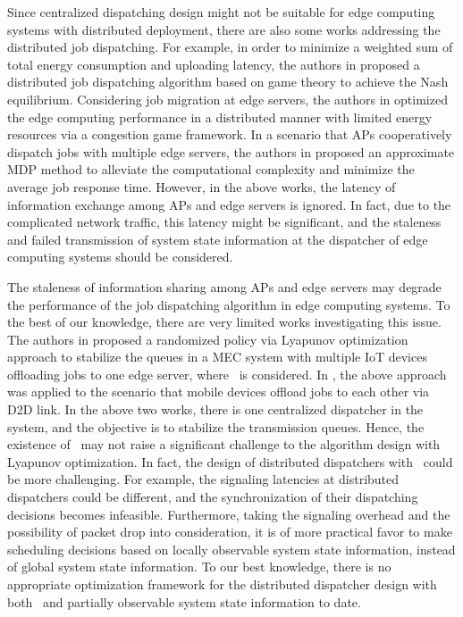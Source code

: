 Since centralized dispatching design might not be suitable for {edge computing systems} with distributed deployment, there are also some works addressing the distributed job dispatching.
For example, in order to minimize a weighted sum of total energy consumption and uploading latency, the authors in \cite{ToN-Xuchen2016} proposed a distributed job dispatching algorithm based on game theory to achieve the Nash equilibrium. 
Considering job migration at edge servers, the authors in \cite{ToN-xujie2018} optimized the edge computing performance in a distributed manner with limited energy resources via a congestion game framework.
In a scenario that APs cooperatively dispatch jobs with multiple edge servers, the authors in \cite{mdp-jcin} proposed {an} approximate MDP method to alleviate the computational complexity and minimize the average job response time.
However, in the above works, the latency of information exchange among APs and edge servers is ignored.
In fact, due to the complicated network traffic, this latency might be significant, and the staleness {and failed transmission} of system state information at the dispatcher of edge computing systems should be considered.

The staleness of information sharing among APs and edge servers may degrade the performance of the job dispatching algorithm in edge computing systems.
To the best of our knowledge, there are very limited works investigating this issue.
The authors in \cite{JSAC17-LyuX} proposed a randomized policy via Lyapunov optimization approach to stabilize the queues in a MEC system with multiple IoT devices offloading jobs to one edge server, where \brlatency~is considered. 
In \cite{TWC18-LyuX}, the above approach was applied to the scenario that mobile devices offload jobs to each other via D2D link.
In the above two works, there is one centralized dispatcher in the system, and the objective is to stabilize the transmission queues.
Hence, the existence of \brlatency~may not raise a significant challenge to the algorithm design with Lyapunov optimization.
In fact, the design of distributed dispatchers with \brlatency~could be more challenging.
For example, the signaling latencies at distributed dispatchers could be different, and the synchronization of their dispatching decisions becomes infeasible.
Furthermore, taking the signaling overhead and the possibility of packet drop into consideration, it is of more practical favor to make scheduling decisions based on locally observable system state information, instead of global system state information.
To our best knowledge, there is no appropriate optimization framework for the distributed dispatcher design with both \brlatency~and partially observable system state information to date.

